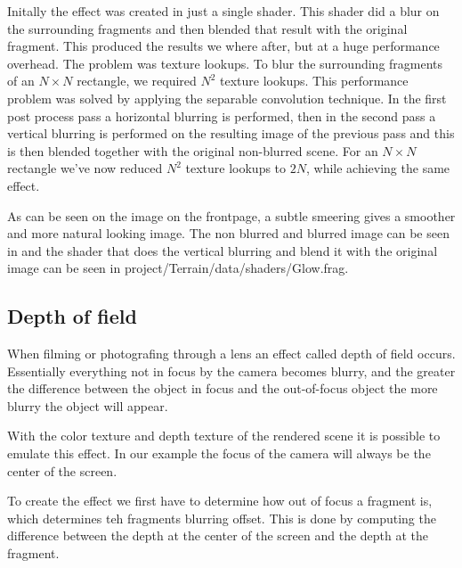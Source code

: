Initally the effect was created in just a single shader. This shader
did a blur on the surrounding fragments and then blended that result
with the original fragment. This produced the results we where after,
but at a huge performance overhead. The problem was texture
lookups. To blur the surrounding fragments of an $N \times N$
rectangle, we required $N^2$ texture lookups. This performance problem
was solved by applying the separable convolution technique. In the
first post process pass a horizontal blurring is performed, then in
the second pass a vertical blurring is performed on the resulting
image of the previous pass and this is then blended together with the
original non-blurred scene. For an $N \times N$ rectangle we've now
reduced $N^2$ texture lookups to $2N$, while achieving the same
effect.

As can be seen on the image on the frontpage, a subtle smeering gives
a smoother and more natural looking image. The non blurred and blurred
image can be seen in  and the shader that does the
vertical blurring and blend it with the original image can be seen in
project/Terrain/data/shaders/Glow.frag.

\begin{figure}
  \centering
  \label{fig:glow}
\end{figure}


\subsection{Depth of field}

When filming or photografing through a lens an effect called depth of
field occurs. Essentially everything not in focus by the camera
becomes blurry, and the greater the difference between the object in
focus and the out-of-focus object the more blurry the object will
appear.

With the color texture and depth texture of the rendered scene it is
possible to emulate this effect. In our example the focus of the
camera will always be the center of the screen.

To create the effect we first have to determine how out of focus a
fragment is, which determines teh fragments blurring offset. This is
done by computing the difference between the depth at the center of
the screen and the depth at the fragment.

